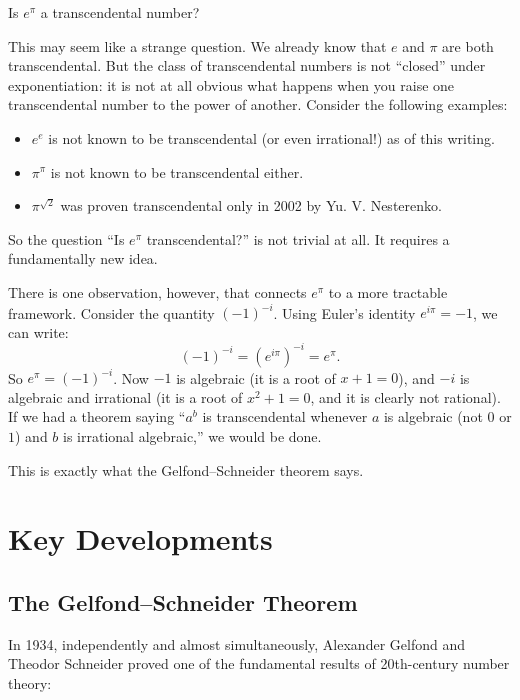 \begin{problem_statement}
Is $e^\pi$ a transcendental number?
\end{problem_statement}

This may seem like a strange question. We already know that $e$ and $\pi$ are both transcendental. But the class of transcendental numbers is not ``closed'' under exponentiation: it is not at all obvious what happens when you raise one transcendental number to the power of another. Consider the following examples:

\begin{itemize}
    \item $e^e$ is not known to be transcendental (or even irrational!) as of this writing.
    \item $\pi^\pi$ is not known to be transcendental either.
    \item $\pi^{\sqrt{2}}$ was proven transcendental only in 2002 by Yu. V. Nesterenko.
\end{itemize}

So the question ``Is $e^\pi$ transcendental?'' is not trivial at all. It requires a fundamentally new idea.

There is one observation, however, that connects $e^\pi$ to a more tractable framework. Consider the quantity $(-1)^{-i}$. Using Euler's identity $e^{i\pi} = -1$, we can write:
\[
    (-1)^{-i} = \left(e^{i\pi}\right)^{-i} = e^{\pi}.
\]
So $e^\pi = (-1)^{-i}$. Now $-1$ is algebraic (it is a root of $x + 1 = 0$), and $-i$ is algebraic and irrational (it is a root of $x^2 + 1 = 0$, and it is clearly not rational). If we had a theorem saying ``$a^b$ is transcendental whenever $a$ is algebraic (not $0$ or $1$) and $b$ is irrational algebraic,'' we would be done.

This is exactly what the Gelfond--Schneider theorem says.

\section{Key Developments}

\subsection{The Gelfond--Schneider Theorem}

In 1934, independently and almost simultaneously, Alexander Gelfond and Theodor Schneider proved one of the fundamental results of 20th-century number theory:

